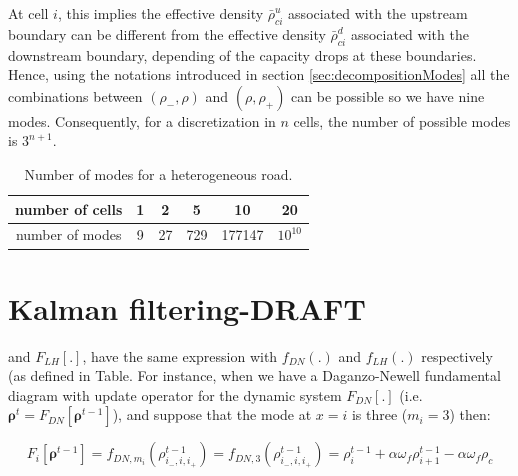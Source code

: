 \documentclass[11pt]{article}
\numberwithin{equation}{section}
\numberwithin{figure}{section}
\numberwithin{table}{section}
\begin{document}
At cell $i$, this implies the effective density $\bar{\rho}^{u}_{ci}$ associated with the upstream boundary can be different from the effective density $\bar{\rho}^{d}_{ci}$ associated with the downstream boundary, depending of the capacity drops at these boundaries. Hence, using the notations introduced in section \ref{sec:decompositionModes} all the combinations between $(\rho_{-},\rho)$ and $(\rho,\rho_{+})$ can be possible so we have nine modes. Consequently, for a discretization in $n$ cells, the number of possible modes is $3^{n+1}$.

\begin{table}[ht]
\centering %
\begin{tabular}{|c|c|c|c|c|c|}
  \hline
 number of cells & 1 & 2 & 5 & 10 & 20\\
  \hline
 number of modes & 9 & 27 & 729 & 177147 & $10^{10}$\\
  \hline
\end{tabular}
\label{table:numModes2} %
\caption{Number of modes for a heterogeneous road.}
\end{table}

\section{Kalman filtering-DRAFT}

and $F_{LH}[.]$, have the same expression with $f_{DN}(.)$ and $f_{LH}(.)$ respectively (as defined in Table. For instance, when we have a Daganzo-Newell fundamental diagram with update operator for the dynamic system $F_{DN}[.]$ (i.e. $\boldsymbol\rho^{t} = F_{DN}[\boldsymbol\rho^{t-1}]$), and suppose that the mode at $x=i$ is three ($m_{i}=3$) then\footnotemark: 

\begin{equation}
F_{i}[\boldsymbol\rho^{t-1}] = f_{DN,m_{i}}(\rho^{t-1}_{i_{-},i,i_{+}}) = f_{DN,3}(\rho^{t-1}_{i_{-},i,i_{+}}) = 
\rho^{t-1}_{i} + \alpha \omega_{f}\rho^{t-1}_{i+1} - \alpha \omega_{f}\rho_{c}
\label{eq:example}
\end{equation}

\end{document}
